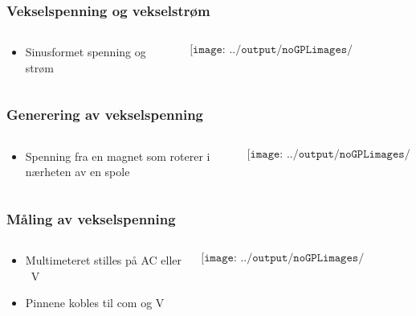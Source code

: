 \documentclass[aspectratio=169,xcolor=dvipsnames]{beamer}
\begin{document}
\begin{frame}
	\frametitle{Vekselspenning og vekselstrøm}

	\begin{columns}
		\begin{column}{0.5\textwidth}
			\begin{itemize}
				\item Sinusformet spenning og strøm
			\end{itemize}
		\end{column}

		\begin{column}{0.5\textwidth}
			$$\texttt{[image: ../output/noGPLimages/tifel07.png]}$$
		\end{column}
	\end{columns}
\end{frame}

\begin{frame}
	\frametitle{Generering av vekselspenning}

	\begin{columns}
		\begin{column}{0.2\textwidth}
			\begin{itemize}
				\item Spenning fra en magnet som roterer i nærheten av en spole 
			\end{itemize}
		\end{column}

		\begin{column}{0.8\textwidth}
			$$\texttt{[image: ../output/noGPLimages/tifel08.png]}$$
		\end{column}
	\end{columns}

\end{frame}
\begin{frame}
	\frametitle{Måling av vekselspenning}

	\begin{columns}
		\begin{column}{0.5\textwidth}
			\begin{itemize}
				\item Multimeteret stilles på AC eller ~V
				\item Pinnene kobles til com og V
			\end{itemize}
		\end{column}

		\begin{column}{0.5\textwidth}
			$$\texttt{[image: ../output/noGPLimages/tifel10.png]}$$
		\end{column}
	\end{columns}
\end{frame}
\end{document}
